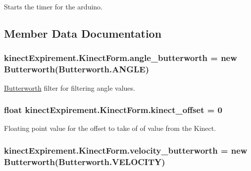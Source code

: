 Starts the timer for the arduino. 



\subsection{Member Data Documentation}
\subsubsection[{\texorpdfstring{angle\+\_\+butterworth}{angle_butterworth}}]{ kinect\+Expirement.\+Kinect\+Form.\+angle\+\_\+butterworth = new {\bf Butterworth}(Butterworth.\+A\+N\+G\+LE)}\hypertarget{classkinect_expirement_1_1_kinect_form_abec90e6db4a70d6cccc38f90f800e3ab}{}\label{classkinect_expirement_1_1_kinect_form_abec90e6db4a70d6cccc38f90f800e3ab}


\hyperlink{classkinect_expirement_1_1_butterworth}{Butterworth} filter for filtering angle values. 

\subsubsection[{\texorpdfstring{kinect\+\_\+offset}{kinect_offset}}]{\setlength{\rightskip}{0pt plus 5cm}float kinect\+Expirement.\+Kinect\+Form.\+kinect\+\_\+offset = 0}\hypertarget{classkinect_expirement_1_1_kinect_form_a97a0dd9256e1093328fafccaca672398}{}\label{classkinect_expirement_1_1_kinect_form_a97a0dd9256e1093328fafccaca672398}


Floating point value for the offset to take of of value from the Kinect. 

\subsubsection[{\texorpdfstring{velocity\+\_\+butterworth}{velocity_butterworth}}]{ kinect\+Expirement.\+Kinect\+Form.\+velocity\+\_\+butterworth = new {\bf Butterworth}({\bf Butterworth.\+V\+E\+L\+O\+C\+I\+TY})}\hypertarget{classkinect_expirement_1_1_kinect_form_a7f1502bd90febb3137d8e4fdf71d52ec}{}\label{classkinect_expirement_1_1_kinect_form_a7f1502bd90febb3137d8e4fdf71d52ec}


